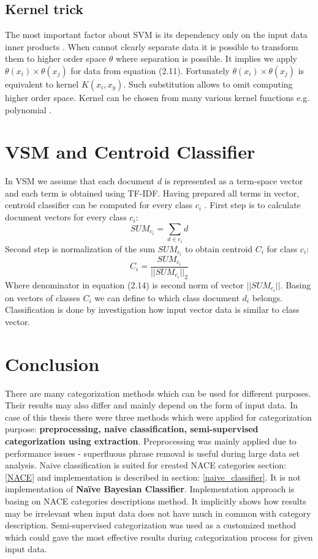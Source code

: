 \subsection{Kernel trick}
The most important factor about SVM is its dependency only on the input data inner products \cite{6}. When cannot clearly separate data it is possible to transform them to higher order space $\theta$ where separation is possible. It implies we apply $\theta(x_i) \times \theta(x_j)$ for data from equation (2.11). Fortunately $\theta(x_i) \times \theta(x_j)$ is equivalent to kernel $K(x_i,x_y)$. Such substitution allows to omit computing higher order space. Kernel can be chosen from many various kernel functions e.g. polynomial \cite{svm_wiki}.

\section{VSM and Centroid Classifier}
In VSM we assume that each document $d$ is represented as a term-space vector and each term is obtained using TF-IDF. Having prepared all terms in vector, centroid classifier can be computed for every class $c_i$ \cite{8}.
\newline First step is to calculate document vectors for every class $c_i$:
\begin{equation}
SUM_{c_i} = \sum_{d\in c_i}d
\end{equation}
\newline Second step is normalization of the sum $SUM_{c_i}$ to obtain centroid $C_i$ for class $c_i$:
\begin{equation}
C_i = \frac{SUM_{c_i}}{||SUM_{c_i}||_2}
\end{equation}
Where denominator in equation (2.14) is second norm of vector $||SUM_{c_i}||$. Basing on vectors of classes $C_i$ we can define to which class document $d_i$ belongs. Classification is done by investigation how input vector data is similar to class vector. 

\section{Conclusion}
There are many categorization methods which can be used for different purposes. Their results may also differ and mainly depend on the form of input data. In case of this thesis there were three methods which were applied for categorization purpose: \textbf{preprocessing, naive classification, semi-supervised categorization using extraction}. Preprocessing was mainly applied due to performance issues - superfluous phrase removal is useful during large data set analysis. Naive classification is suited for created NACE categories section: \ref{NACE} and implementation is described in section: \ref{naive_classifier}. It is not implementation of \textbf{Naïve Bayesian Classifier}. Implementation approach is basing on NACE categories descriptions method. It implicitly shows how results may be irrelevant when input data does not have much in common with category description. Semi-supervised categorization was used as a customized method which could gave the most effective results during categorization process for given input data.    


